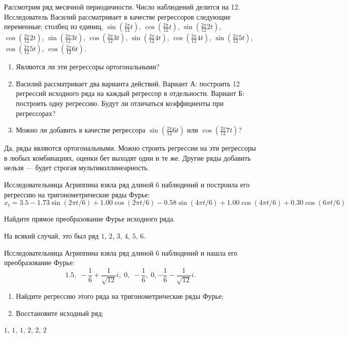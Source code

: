 \begin{problem}
  Рассмотрим ряд месячной периодичности. Число наблюдений делится на 12. Исследователь Василий рассматривает в качестве регрессоров следующие переменные: столбец из единиц,
  $\sin\left(\frac{2\pi}{12} t\right)$,
 $\cos\left(\frac{2\pi}{12} t\right)$,
 $\sin\left(\frac{2\pi}{12} 2t\right)$,
 $\cos\left(\frac{2\pi}{12} 2t\right)$,
 $\sin\left(\frac{2\pi}{12} 3t\right)$,
 $\cos\left(\frac{2\pi}{12} 3t\right)$,
 $\sin\left(\frac{2\pi}{12} 4t\right)$,
 $\cos\left(\frac{2\pi}{12} 4t\right)$,
 $\sin\left(\frac{2\pi}{12} 5t\right)$,
 $\cos\left(\frac{2\pi}{12} 5t\right)$,
 $\cos\left(\frac{2\pi}{12} 6t\right)$.

 \begin{enumerate}
   \item Являются ли эти регрессоры ортогональными?
   \item Василий рассматривает два варианта действий.
     Вариант А: построить 12 регрессий исходного ряда на каждый регрессор в отдельности. Вариант Б: построить одну регрессию.
     Будут ли отличаться коэффициенты при регрессорах?
    \item Можно ли добавить в качестве регрессора $\sin\left(\frac{2\pi}{12} 6t\right)$ или  $\cos\left(\frac{2\pi}{12} 7t\right)$?
  \end{enumerate}
 \begin{sol}
   Да, ряды являются ортогональными. Можно строить регрессии на эти регрессоры в любых комбинациях, оценки бет выходят одни и те же.
   Другие ряды добавить нельзя — будет строгая мультиколлинеарность.
 \end{sol}
 \end{problem}

 \begin{problem}
   Исследовательница Агриппина взяла ряд длиной 6 наблюдений и построила его регрессию на тригонометрические ряды Фурье:
   \[
     \hat x_t = 3.5 - 1.73 \sin(2\pi t/6) + 1.00 \cos(2\pi t/6) - 0.58\sin(4\pi t/6) + 1.00 \cos(4\pi t/6) +0.30 \cos(6\pi t/6)
   \]

   Найдите прямое преобразование Фурье исходного ряда.
   \begin{sol}
     На всякий случай, это был ряд $1$, $2$, $3$, $4$, $5$, $6$.
   \end{sol}
 \end{problem}


 \begin{problem}
   Исследовательница Агриппина взяла ряд длиной 6 наблюдений и нашла его преобразование Фурье:
   \[
     1.5, \; -\frac{1}{6}+\frac{1}{\sqrt{12}}i, \; 0, \; -\frac{1}{6}, \; 0, -\frac{1}{6} - \frac{1}{\sqrt{12}}i.
   \]
   \begin{enumerate}
     \item Найдите регрессию этого ряда на тригонометрические ряды Фурье;
     \item Восстановите исходный ряд;
   \end{enumerate}

   \begin{sol}
   $1$, $1$, $1$, $2$, $2$, $2$
   \end{sol}
 \end{problem}


